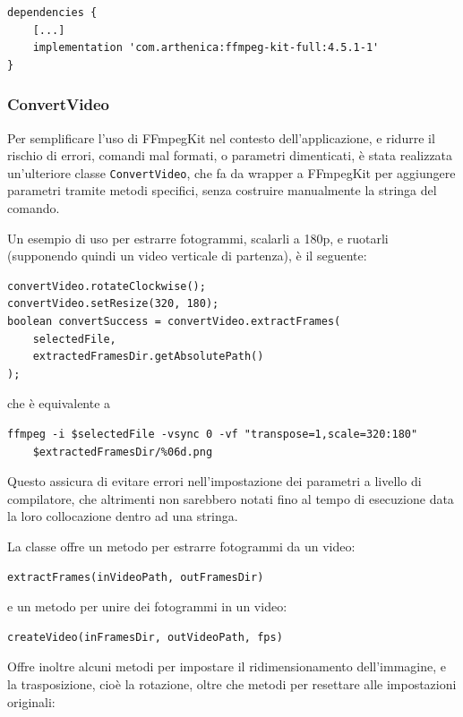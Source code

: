 \begin{verbatim}
dependencies {
    [...]
    implementation 'com.arthenica:ffmpeg-kit-full:4.5.1-1'
}
\end{verbatim}

\subsubsection*{ConvertVideo}

Per semplificare l'uso di FFmpegKit nel contesto dell'applicazione, e ridurre il rischio
di errori, comandi mal formati, o parametri dimenticati, è stata realizzata un'ulteriore 
classe \texttt{ConvertVideo}, che fa da wrapper a FFmpegKit per aggiungere parametri tramite 
metodi specifici, senza costruire manualmente la stringa del comando.

Un esempio di uso per estrarre fotogrammi, scalarli a 180p, e ruotarli (supponendo quindi un 
video verticale di partenza), è il seguente:

\begin{lstlisting}
convertVideo.rotateClockwise();
convertVideo.setResize(320, 180);
boolean convertSuccess = convertVideo.extractFrames(
    selectedFile,
    extractedFramesDir.getAbsolutePath()
);
\end{lstlisting}

che è equivalente a 

\begin{verbatim}
ffmpeg -i $selectedFile -vsync 0 -vf "transpose=1,scale=320:180" 
    $extractedFramesDir/%06d.png
\end{verbatim}

Questo assicura di evitare errori nell'impostazione dei parametri a livello di compilatore, 
che altrimenti non sarebbero notati fino al tempo di esecuzione data la loro collocazione dentro
ad una stringa.

La classe offre un metodo per estrarre fotogrammi da un video:
\begin{lstlisting}
extractFrames(inVideoPath, outFramesDir)
\end{lstlisting}

e un metodo per unire dei fotogrammi in un video:
\begin{lstlisting}
createVideo(inFramesDir, outVideoPath, fps)
\end{lstlisting}

Offre inoltre alcuni metodi per impostare il ridimensionamento dell'immagine, e la trasposizione,
cioè la rotazione, oltre che metodi per resettare alle impostazioni originali:

